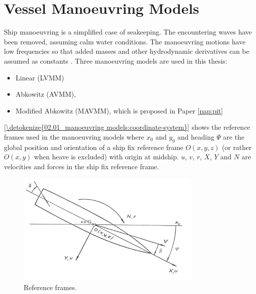 \section{Vessel Manoeuvring Models} \label{sec:manoeuvring model}
\label{\detokenize{02.01_manoeuvring models:vessel-manoeuvring-models}}\label{\detokenize{02.01_manoeuvring models:vmm}}\label{\detokenize{02.01_manoeuvring models::doc}}
Ship manoeuvring is a simplified case of seakeeping. The encountering waves have been removed, assuming calm water conditions. The manoeuvring motions have low frequencies so that added masses and other hydrodynamic derivatives can be assumed as constants  \cite{fossen_handbook_2021}. Three manoeuvring models are used in this thesis: 
\begin{itemize}
    \item Linear (LVMM) \cite{matusiak_dynamics_2017}
    \item Abkowitz (AVMM), \cite{abkowitz_ship_1964}
    \item Modified Abkowitz (MAVMM), which is proposed in Paper \ref{pap:pit}
\end{itemize}

\noindent\autoref{\detokenize{02.01_manoeuvring models:coordinate-system}} shows the reference frames used in the manoeuvring models where \(x_0\) and \(y_0\) and heading \(\Psi\) are the global position and orientation of a ship fix reference frame \(O(x,y,z)\) (or rather \(O(x,y)\) when heave is excluded) with origin at midship. \(u\), \(v\), \(r\), \(X\), \(Y\) and \(N\) are velocities and forces in the ship fix reference frame.



\begin{figure}[H]
    \centering
    \includegraphics[width=0.8\textwidth]{kappa/images/coordinate_system.PNG}
    \caption{Reference frames.}
    \label{\detokenize{02.01_manoeuvring models:coordinate-system}}
\end{figure}

